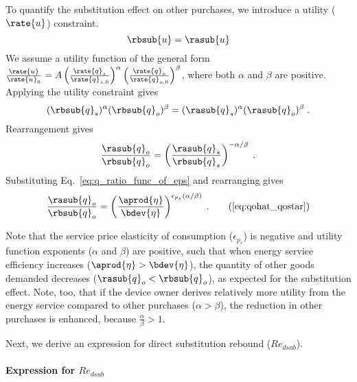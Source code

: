 To quantify the substitution effect on other purchases,
we introduce a utility ($\rate{u}$) constraint.
%
\begin{equation}
  \rbsub{u} = \rasub{u}
\end{equation}
%
We assume a utility function of the general form
$\frac{\rate{u}}{\rate{u}_0}
      = A \left( \frac{\rate{q}_s}{\rate{q}_{s,0}} \right)^\alpha \left( \frac{\rate{q}_o}{\rate{q}_{o,0}} \right)^\beta$,
where both $\alpha$ and $\beta$ are positive.
Applying the utility constraint gives
%
\begin{equation}
  (\rbsub{q}_s)^\alpha (\rbsub{q}_o)^\beta = (\rasub{q}_s)^\alpha (\rasub{q}_o)^\beta \; .
\end{equation}
%
Rearrangement gives
%
\begin{equation}
  \frac{\rasub{q}_o}{\rbsub{q}_o} = \left( \frac{\rasub{q}_s}{\rbsub{q}_s} \right) ^ {- \alpha / \beta} \; .
\end{equation}
%
Substituting Eq.~\ref{eq:q_ratio_func_of_eps} and rearranging gives
%
\begin{equation}
  \frac{\rasub{q}_o}{\rbsub{q}_o} = \left( \frac{\aprod{\eta}}{\bdev{\eta}}\right) ^ {\epsilon_{p_s} (\alpha / \beta)} \; . 
                                                                                              \tag{\ref{eq:qohat_qostar}}
\end{equation}

Note that the service price elasticity of consumption ($\epsilon_{p_s}$)
is negative and utility function exponents ($\alpha$ and $\beta$) are positive, such that
when energy service efficiency increases ($\aprod{\eta} > \bdev{\eta}$),
the quantity of other goods demanded decreases ($\rasub{q}_o < \rbsub{q}_o$),
as expected for the substitution effect.
Note, too, that if the device owner derives relatively more utility
from the energy service compared to other purchases ($\alpha > \beta$),
the reduction in other purchases is enhanced, because $\frac{\alpha}{\beta} > 1$.

Next, we derive an expression for direct substitution rebound ($Re_{dsub}$).


\paragraph{Expression for $Re_{dsub}$}
\label{sec:Re_dsub}

